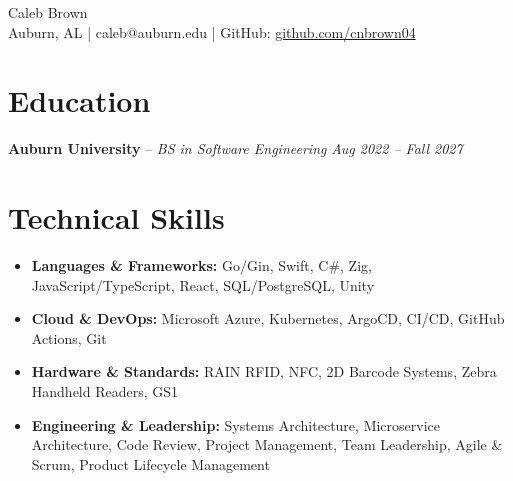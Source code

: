 \documentclass[10pt]{article}       %
\begin{document}
{\centering
{\Huge Caleb Brown}\\[5pt]
Auburn, AL | caleb@auburn.edu | GitHub: \href{https://github.com/cnbrown04}{github.com/cnbrown04}\par}

\section*{Education}
\textbf{Auburn University} -- \textit{BS in Software Engineering} \hfill \textit{Aug 2022 -- Fall 2027}

\section*{Technical Skills}
\begin{itemize}
  \item \textbf{Languages \& Frameworks:} Go/Gin, Swift, C\#, Zig, JavaScript/TypeScript, React, SQL/PostgreSQL, Unity
  \item \textbf{Cloud \& DevOps:} Microsoft Azure, Kubernetes, ArgoCD, CI/CD, GitHub Actions, Git
  \item \textbf{Hardware \& Standards:} RAIN RFID, NFC, 2D Barcode Systems, Zebra Handheld Readers, GS1
  \item \textbf{Engineering \& Leadership:} Systems Architecture, Microservice Architecture, Code Review, Project Management, Team Leadership, Agile \& Scrum, Product Lifecycle Management
\end{itemize}

\end{document}
